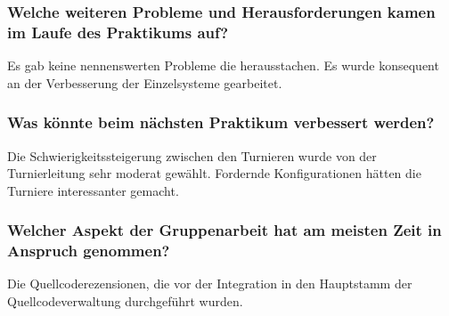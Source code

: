 \documentclass[runningheads]{llncs}
\begin{document}
	\subsubsection{Welche weiteren Probleme und Herausforderungen kamen im Laufe des Praktikums auf?\\}
	Es gab keine nennenswerten Probleme die herausstachen. Es wurde konsequent an der Verbesserung der Einzelsysteme gearbeitet. 
	
	\subsubsection{Was könnte beim nächsten Praktikum verbessert werden?\\}
	Die Schwierigkeitssteigerung zwischen den Turnieren wurde von der Turnierleitung sehr moderat gewählt. Fordernde Konfigurationen hätten die Turniere interessanter gemacht.
	
	\subsubsection{Welcher Aspekt der Gruppenarbeit hat am meisten Zeit in Anspruch genommen?\\}
	Die Quellcoderezensionen, die vor der Integration in den Hauptstamm der Quellcodeverwaltung durchgeführt wurden. 
	
\end{document}
